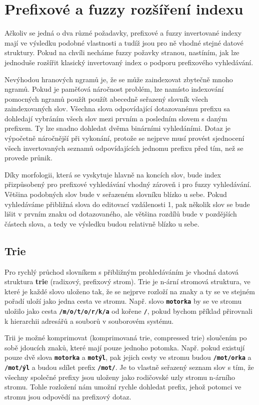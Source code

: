 \documentclass[11pt,letterpaper,oneside,openright]{book}
\newcommand{\bftt}[1]{\texttt{\textbf{#1}}}
\begin{document}
\section{Prefixové a fuzzy rozšíření indexu}
Ačkoliv se jedná o dva různé požadavky, prefixové a fuzzy invertované indexy
mají ve výsledku podobné vlastnosti a tudíž jsou pro ně vhodné stejné datové
struktury. Pokud na chvíli necháme fuzzy požavky stranou, nastíním, jak lze
jednoduše rozšířit klasický invertovaný index o podporu prefixového
vyhledávání.

Nevýhodou hranových ngramů je, že se může zaindexovat zbytečně mnoho ngramů.
Pokud je paměťová náročnost problém, lze namísto indexování pomocných ngramů
použít použít abecedně seřazený slovník všech zaindexovaných slov.  Všechna
slova odpovídající dotazovanému prefixu sa dohledají vybráním všech slov mezi
prvním a posledním slovem s daným prefixem. Ty lze snadno dohledat dvěma
binárními vyhledáními. Dotaz je výpočetně náročnější při vykonání, protože se
nejprve musí provést sjednocení všech invertovaných seznamů odpovídajících
jednomu prefixu před tím, než se provede průnik.

Díky morfologii, která se vyskytuje hlavně na koncích slov, bude index
přizpůsobený pro prefixové vyhledávání vhodný zároveň i pro fuzzy vyhledávání.
Většina podobných slov bude v seřazeném slovníku blízko u sebe. Pokud
vyhledáváme přibližná slova do editovací vzdálenosti 1, pak několik slov se
bude lišit v prvním znaku od dotazovaného, ale většina rozdílů bude v
pozdějších částech slova, a tedy ve výsledku budou relativně blízko u sebe.


\subsection{Trie}
Pro rychlý průchod slovníkem s přibližným prohledáváním je vhodná datová
struktura \textbf{trie} (radixový, prefixový strom). Trie je n-ární stromová
struktura, ve které je každé slovo uloženo tak, že se nejprve rozloží na znaky
a ty se ve stejném pořadí uloží jako jedna cesta ve stromu. Např. slovo
\bftt{motorka} by se ve stromu uložilo jako cesta \bftt{/m/o/t/o/r/k/a} od
kořene \bftt{/}, pokud bychom příklad přirovnali k hierarchii adresářů a
souborů v souborovém systému.

Trii je možné komprimovat (komprimovaná trie, compressed trie) sloučením po
sobě jdoucích znaků, které mají pouze jednoho potomka. Např. pokud existují
pouze dvě slova \bftt{motorka} a \bftt{motýl}, pak jejich cesty ve stromu
budou \bftt{/mot/orka} a \bftt{/mot/ýl} a budou sdílet prefix \bftt{/mot/}.
Je to vlastně seřazený seznam slov s tím, že všechny společné prefixy jsou
uloženy jako rodičovské uzly stromu n-árního stromu. Tohle rozložení nám umožní
rychle dohledat prefix, jehož potomci ve stromu jsou odpovědí na prefixový
dotaz.
\end{document}
